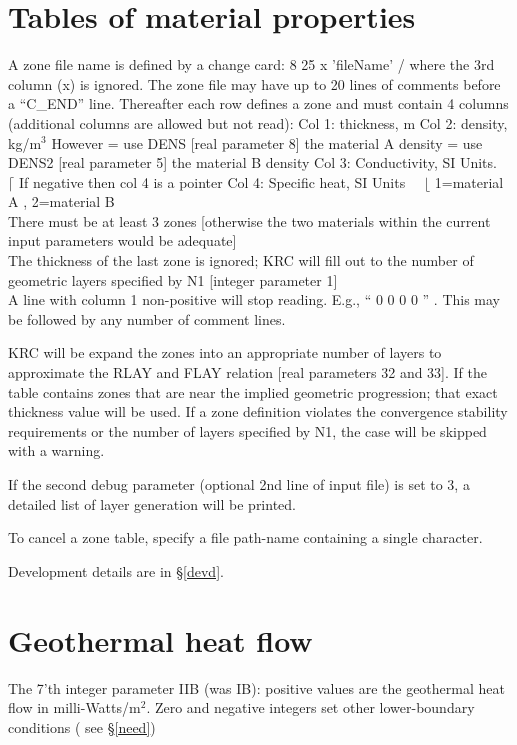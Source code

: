 \documentclass{article}
\begin{document}
\section{Tables of material properties \label{zone}}
A zone file name is defined by a change card: 8 25 x 'fileName' / where the 3rd column (x) is
ignored. The zone file may have up to 20 lines of comments before a ``C_END''
line. Thereafter each row defines a zone and must contain 4 columns (additional
columns are allowed but not read):
\qi Col 1: thickness, m
\qi Col 2: density, kg/m$^3$ \hspace{1.0 cm} However
 = use DENS [real parameter 8] the material A density
 = use DENS2 [real parameter 5] the material B density
\qi Col 3: Conductivity, SI Units. \ $\lceil$   If negative then col 4 is a pointer
\qi Col 4: Specific heat, SI Units \ \  $\lfloor$  1=material A , 2=material B 
\\ There must be at least 3 zones [otherwise the two materials within the current input parameters would be adequate]
\\ The thickness of the last zone is ignored; KRC will fill out to the number of geometric layers specified by N1 [integer parameter 1] 
\\ A line with column 1 non-positive will stop reading. E.g., `` 0 0 0 0 '' . This may be followed by any number of comment lines.

KRC will be expand the zones into an appropriate number of layers to approximate
the RLAY and FLAY relation [real parameters 32 and 33]. If the table contains
zones that are near the implied geometric progression; that exact thickness
value will be used.  If a zone definition violates the convergence stability
requirements or the number of layers specified by N1, the case will be skipped
with a warning.

If the second debug parameter (optional 2nd line of input file) is set to 3, a detailed list of layer generation will be printed. 

To cancel a zone table, specify a file path-name containing a single character.

Development details are in \S \ref{devd}.

\section{Geothermal heat flow \label{ghf}}

The 7'th integer parameter IIB (was IB): positive values are the geothermal heat
flow in milli-Watts/m$^2$. Zero and negative integers set other lower-boundary
conditions ( see \S \ref{need})  
\end{document}
